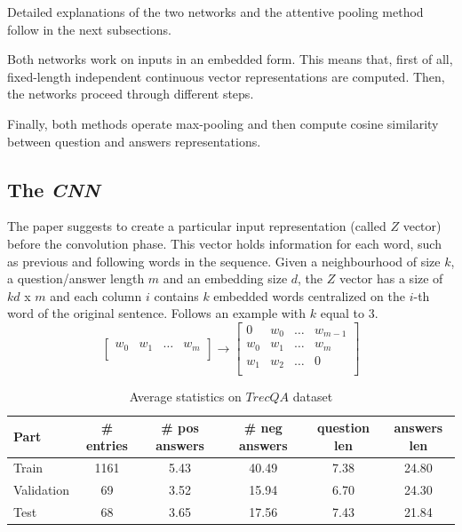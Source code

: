 \documentclass[11pt,a4paper]{article}
\begin{document}
Detailed explanations of the two networks and the attentive pooling method follow in the next subsections.

Both networks work on inputs in an embedded form. This means that, first of all, fixed-length independent continuous vector representations are computed. Then, the networks proceed through different steps.

Finally, both methods operate max-pooling and then compute cosine similarity between question and answers representations. 

\subsection{The \textit{CNN}}

The paper suggests to create a particular input representation (called $Z$ vector) before the convolution phase. This vector holds information for each word, such as previous and following words in the sequence. Given a neighbourhood of size $k$, a question/answer length $m$ and an embedding size $d$, the $Z$ vector has a size of $kd$ x $m$ and each column $i$ contains $k$ embedded words centralized on the $i$-th word of the original sentence. Follows an example with $k$ equal to $3$.
\[
\begin{bmatrix}
    w_0 & w_1 & \dots & w_m \\
\end{bmatrix}
 \rightarrow
\begin{bmatrix}
    0 & w_0 & \dots & w_{m-1} \\
    w_0 & w_1 & \dots & w_m \\
    w_1 & w_2 & \dots & 0 \\
\end{bmatrix}
\]

\begin{table}[h]
  \centering
  \begin{tabular}{|l|c|c|c|c|c|}
    \hline
    \bf Part & \bf \# entries & \bf \# pos answers & \bf \# neg answers & \bf question len & \bf answers len \\
    \hline
    Train & 1161 & 5.43 & 40.49 & 7.38 & 24.80 \\
    Validation & 69 & 3.52 & 15.94 & 6.70 & 24.30 \\
    Test & 68 & 3.65 & 17.56 & 7.43 & 21.84 \\
    \hline
  \end{tabular}
  \caption{Average statistics on $TrecQA$ dataset}
  \label{table:statstrec}
\end{table}
\end{document}
